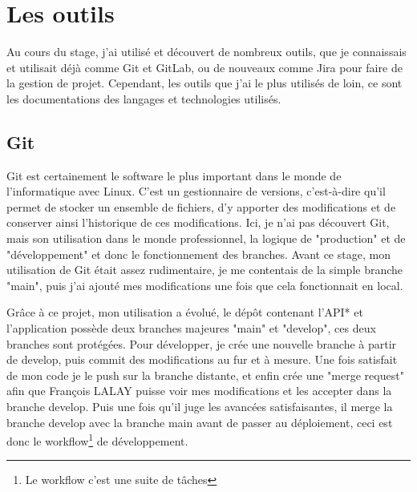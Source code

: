 \documentclass[a4paper,12pt]{report}
\begin{document}
\section{Les outils}
Au cours du stage, j'ai utilisé et découvert de nombreux outils, que je connaissais et utilisait déjà comme Git et GitLab, ou de nouveaux comme Jira pour faire de la gestion de projet. Cependant, les outils que j'ai le plus utilisés de loin, ce sont les documentations des langages et technologies utilisés.

\subsection{Git}
Git est certainement le software le plus important dans le monde de l'informatique avec Linux. C'est un gestionnaire de versions, c'est-à-dire qu'il permet de stocker un ensemble de fichiers, d'y apporter des modifications et de conserver ainsi l'historique de ces modifications. Ici, je n'ai pas découvert Git, mais son utilisation dans le monde professionnel, la logique de "production" et de "développement" et donc le fonctionnement des branches. Avant ce stage, mon utilisation de Git était assez rudimentaire, je me contentais de la simple branche "main", puis j'ai ajouté mes modifications une fois que cela fonctionnait en local.


Grâce à ce projet, mon utilisation a évolué, le dépôt contenant l'API* et l'application possède deux branches majeures "main" et "develop", ces deux branches sont protégées. Pour développer, je crée une nouvelle branche à partir de develop, puis commit des modifications au fur et à mesure. Une fois satisfait de mon code je le push sur la branche distante, et enfin crée une "merge request" afin que François LALAY puisse voir mes modifications et les accepter dans la branche develop. Puis une fois qu'il juge les avancées satisfaisantes, il merge la branche develop avec la branche main avant de passer au déploiement, ceci est donc le workflow\footnote{Le workflow c'est une suite de tâches} de développement.
\end{document}
